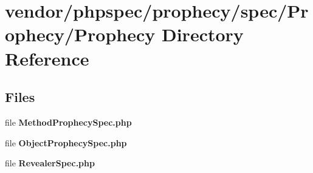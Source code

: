 \section{vendor/phpspec/prophecy/spec/\+Prophecy/\+Prophecy Directory Reference}
\label{dir_15e637e25b712943460daf16af62d25c}
\subsection*{Files}
\begin{DoxyCompactItemize}
\item 
file {\bf Method\+Prophecy\+Spec.\+php}
\item 
file {\bf Object\+Prophecy\+Spec.\+php}
\item 
file {\bf Revealer\+Spec.\+php}
\end{DoxyCompactItemize}
